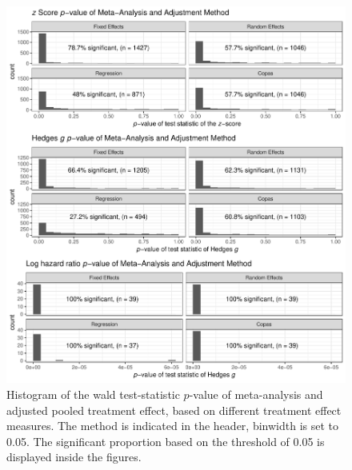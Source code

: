 \documentclass[11pt,a4paper,twoside]{book}\usepackage[]{graphicx}\usepackage[]{color}
\newenvironment{knitrout}{}{} %
\begin{document}
\begin{figure}
\begin{knitrout}
\color{fgcolor}

{\centering \includegraphics[width=\textwidth-3cm]{figure/ch03_figunnamed-chunk-18-1} 

}



\end{knitrout}
\caption{Histogram of the wald test-statistic $p$-value of meta-analysis and adjusted pooled treatment effect, based on different treatment effect measures. The method is indicated in the header, binwidth is set to 0.05. The significant proportion based on the threshold of 0.05 is displayed inside the figures.}
\label{fig:adjustment.stat}
\end{figure}
\end{document}
